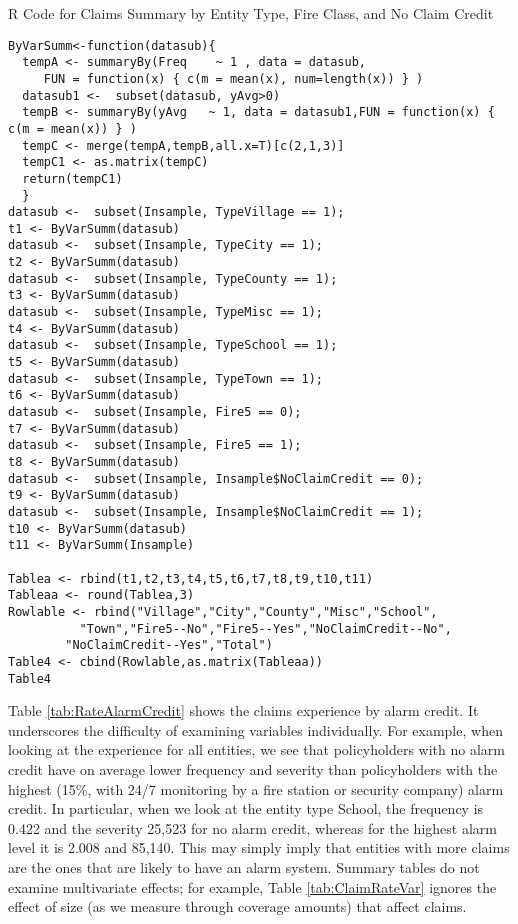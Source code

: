 \documentclass[]{book}
\theoremstyle{definition}
\theoremstyle{definition}
\theoremstyle{definition}
\theoremstyle{remark}
\begin{document}
R Code for Claims Summary by Entity Type, Fire Class, and No Claim
Credit

\hypertarget{display.ClaimRateVar.2}{}
\begin{verbatim}
ByVarSumm<-function(datasub){
  tempA <- summaryBy(Freq    ~ 1 , data = datasub,   
     FUN = function(x) { c(m = mean(x), num=length(x)) } )
  datasub1 <-  subset(datasub, yAvg>0)
  tempB <- summaryBy(yAvg   ~ 1, data = datasub1,FUN = function(x) { c(m = mean(x)) } )
  tempC <- merge(tempA,tempB,all.x=T)[c(2,1,3)]
  tempC1 <- as.matrix(tempC)
  return(tempC1)
  }
datasub <-  subset(Insample, TypeVillage == 1);   
t1 <- ByVarSumm(datasub)
datasub <-  subset(Insample, TypeCity == 1);      
t2 <- ByVarSumm(datasub)
datasub <-  subset(Insample, TypeCounty == 1);   
t3 <- ByVarSumm(datasub)
datasub <-  subset(Insample, TypeMisc == 1);      
t4 <- ByVarSumm(datasub)
datasub <-  subset(Insample, TypeSchool == 1);    
t5 <- ByVarSumm(datasub)
datasub <-  subset(Insample, TypeTown == 1);      
t6 <- ByVarSumm(datasub)
datasub <-  subset(Insample, Fire5 == 0);                      
t7 <- ByVarSumm(datasub)
datasub <-  subset(Insample, Fire5 == 1);                      
t8 <- ByVarSumm(datasub)
datasub <-  subset(Insample, Insample$NoClaimCredit == 0);
t9 <- ByVarSumm(datasub)
datasub <-  subset(Insample, Insample$NoClaimCredit == 1);
t10 <- ByVarSumm(datasub)
t11 <- ByVarSumm(Insample)

Tablea <- rbind(t1,t2,t3,t4,t5,t6,t7,t8,t9,t10,t11)
Tableaa <- round(Tablea,3)
Rowlable <- rbind("Village","City","County","Misc","School",
          "Town","Fire5--No","Fire5--Yes","NoClaimCredit--No",
        "NoClaimCredit--Yes","Total")
Table4 <- cbind(Rowlable,as.matrix(Tableaa))
Table4
\end{verbatim}

Table \ref{tab:RateAlarmCredit} shows the claims experience by alarm
credit. It underscores the difficulty of examining variables
individually. For example, when looking at the experience for all
entities, we see that policyholders with no alarm credit have on average
lower frequency and severity than policyholders with the highest (15\%,
with 24/7 monitoring by a fire station or security company) alarm
credit. In particular, when we look at the entity type School, the
frequency is 0.422 and the severity 25,523 for no alarm credit, whereas
for the highest alarm level it is 2.008 and 85,140. This may simply
imply that entities with more claims are the ones that are likely to
have an alarm system. Summary tables do not examine multivariate
effects; for example, Table \ref{tab:ClaimRateVar} ignores the effect of
size (as we measure through coverage amounts) that affect claims.
\end{document}
